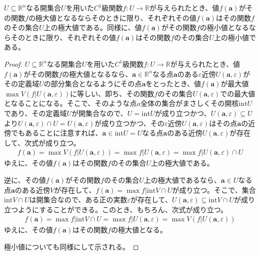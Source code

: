 \documentclass[dvipdfmx]{jsarticle}
\begin{document}
\begin{thm}\label{4.4.4.1}
$U \subseteq \mathbb{R}^{n}$なる開集合$U$を用いた$C^{1}$級関数$f:U \rightarrow \mathbb{R}$が与えられたとき、値$f\left( \mathbf{a} \right)$がその関数$f$の極大値となるならそのときに限り、それぞれその値$f\left( \mathbf{a} \right)$はその関数$f$のその集合$U$上の極大値である。同様に、値$f\left( \mathbf{a} \right)$がその関数$f$の極小値となるならそのときに限り、それぞれその値$f\left( \mathbf{a} \right)$はその関数$f$のその集合$U$上の極小値である。
\end{thm}
\begin{proof}
$U \subseteq \mathbb{R}^{n}$なる開集合$U$を用いた$C^{1}$級関数$f:U \rightarrow \mathbb{R}$が与えられたとき、値$f\left( \mathbf{a} \right)$がその関数$f$の極大値となるなら、$\mathbf{a} \in \mathbb{R}^{n}$なる点$\mathbf{a}$のある$\varepsilon$近傍$U\left( \mathbf{a},\varepsilon \right)$がその定義域$U$の部分集合となるようにその点$\mathbf{a}$をとったとき、値$f\left( \mathbf{a} \right)$が最大値$\max{V\left( f|U\left( \mathbf{a},\varepsilon \right) \right)}$に等しい、即ち、その関数$fのその集合U\left( \mathbf{a},\varepsilon \right)$での最大値となることになる。そこで、そのような点$a$全体の集合がまさしくその開核$\mathrm{int}U$であり、その定義域$U$が開集合なので、$U = \mathrm{int}U$が成り立つかつ、$U\left( \mathbf{a},\varepsilon \right) \subseteq U$より$U\left( \mathbf{a},\varepsilon \right) \cap U = U\left( \mathbf{a},\varepsilon \right)$が成り立つかつ、その$\varepsilon$近傍$U\left( \mathbf{a},\varepsilon \right)$はその点$\mathbf{a}$の近傍でもあることに注意すれば、$\mathbf{a} \in \mathrm{int}U = U$なる点$\mathbf{a}$のある近傍$U\left( \mathbf{a},\varepsilon \right)$が存在して、次式が成り立つ。
\begin{align*}
f\left( \mathbf{a} \right) = \max{V\left( f|U\left( \mathbf{a},\varepsilon \right) \right)} = \max{f|U\left( \mathbf{a},\varepsilon \right)} = \max{f|U\left( \mathbf{a},\varepsilon \right) \cap U}
\end{align*}
ゆえに、その値$f\left( \mathbf{a} \right)$はその関数$f$のその集合$U$上の極大値である。\par
逆に、その値$f\left( \mathbf{a} \right)$がその関数$f$のその集合$U$上の極大値であるなら、$\mathbf{a} \in U$なる点$\mathbf{a}$のある近傍$V$が存在して、$f\left( \mathbf{a} \right) = \max{f|\mathrm{int}V \cap U}$が成り立つ。そこで、集合$\mathrm{int}V \cap U$は開集合なので、ある正の実数$\varepsilon$が存在して、$U\left( \mathbf{a},\varepsilon \right) \subseteq \mathrm{int}V \cap U$が成り立つようにすることができる。このとき、もちろん、次式が成り立つ。
\begin{align*}
f\left( \mathbf{a} \right) = \max{f|\mathrm{int}V \cap U} = \max{f|U\left( \mathbf{a},\varepsilon \right)} = \max{V\left( f|U\left( \mathbf{a},\varepsilon \right) \right)}
\end{align*}
ゆえに、その値$f\left( \mathbf{a} \right)$はその関数$f$の極大値となる。\par
極小値についても同様にして示される。
\end{proof}
\end{document}
